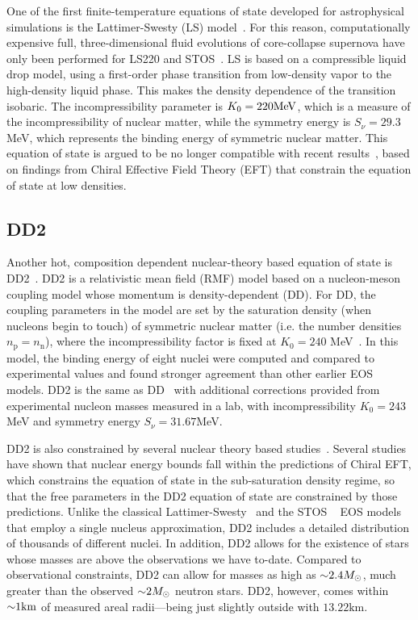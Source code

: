 One of the first finite-temperature equations of state developed for astrophysical simulations is the Lattimer-Swesty (LS) model~\cite{Lattimer:1991nc}.  
For this reason, computationally expensive full, three-dimensional fluid evolutions of core-collapse supernova have only been performed for LS220 and STOS~\cite{Marek2009}.
LS is based on a compressible liquid drop model, using a first-order phase transition from low-density vapor to the high-density liquid phase.  
This makes the density dependence of the transition isobaric.  
The incompressibility parameter is $K_0 = 220 {\rm MeV}$, which is a measure of the incompressibility of nuclear matter, while the symmetry energy is $S_\nu = 29.3$MeV, which represents the binding energy of symmetric nuclear matter.
This equation of state is argued to be no longer compatible with recent results~\cite{Fischer2014}, based on findings from Chiral Effective Field Theory (EFT) that constrain the equation of state at low densities.

\subsection{DD2}
\label{sec:dd2}

Another hot, composition dependent nuclear-theory based equation of state is DD2~\cite{typel2010composition}.  DD2 is a relativistic mean field (RMF) model based on a nucleon-meson coupling model whose momentum is density-dependent (DD).  
For DD, the coupling parameters in the model are set by the saturation density (when nucleons begin to touch) of symmetric nuclear matter (i.e. the number densities $n_\textrm{p} = n_\textrm{n}$), where the incompressibility factor is fixed at $K_0 = 240$ MeV~\cite{typel2005relativistic}.
In this model, the binding energy of eight nuclei were computed and compared to experimental values and found stronger agreement than other earlier EOS models.
DD2 is the same as DD~\cite{typel2005relativistic} with additional corrections provided from experimental nucleon masses measured in a lab, with incompressibility $K_0 = 243$MeV and symmetry energy $S_\nu=31.67$MeV.

DD2 is also constrained by several nuclear theory based studies~\cite{hempel2012new}.
Several studies have shown that nuclear energy bounds fall within the predictions of Chiral EFT, which constrains the equation of state in the sub-saturation density regime, so that the free parameters in the DD2 equation of state are constrained by those predictions. 
Unlike the classical Lattimer-Swesty~\cite{Lattimer:1991nc} and the STOS ~\cite{Shen:1998gq} EOS models that employ a single nucleus approximation, DD2 includes a detailed distribution of thousands of different nuclei.
In addition, DD2 allows for the existence of stars whose masses are above the observations we have to-date.
Compared to observational constraints, DD2 can allow for masses as high as $\mathord{\sim} 2.4 M_\odot$, much greater than the observed $\mathord{\sim} 2 M_\odot$ neutron stars.
DD2, however, comes within $\mathord{\sim} 1 \textrm{km}$ of measured areal radii---being just slightly outside with $13.22 \textrm{km}$.

